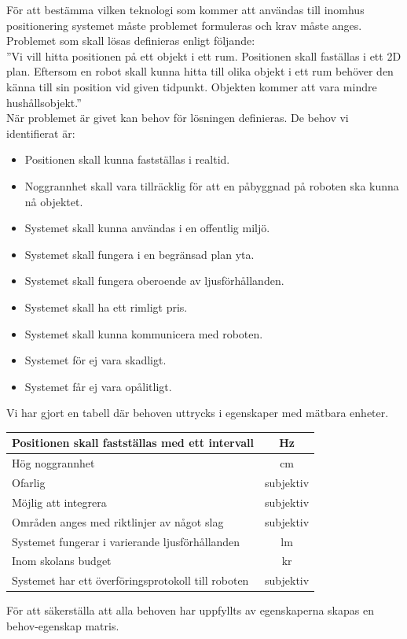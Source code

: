 \documentclass[11pt, a4paper]{report}
\begin{document}
För att bestämma vilken teknologi som kommer att användas till inomhus positionering systemet måste problemet formuleras och krav måste anges. Problemet som skall lösas definieras enligt följande: \\

''Vi vill hitta positionen på ett objekt i ett rum. Positionen skall faställas i ett 2D plan. Eftersom en robot skall kunna hitta till olika objekt  i ett rum behöver den känna till sin position vid given tidpunkt. Objekten kommer att vara mindre hushållsobjekt.'' \\

När problemet är givet kan behov för lösningen definieras. De behov vi identifierat är:

\begin{itemize}
	\item Positionen skall kunna fastställas i realtid.
	\item Noggrannhet skall vara tillräcklig för att en påbyggnad på roboten ska kunna nå objektet.
	\item Systemet skall kunna användas i en offentlig miljö.
	\item Systemet skall fungera i en begränsad plan yta.
	\item Systemet skall fungera oberoende av ljusförhållanden.
	\item Systemet skall ha ett rimligt pris.
	\item Systemet skall kunna kommunicera med roboten.
	\item Systemet för ej vara skadligt.
	\item Systemet får ej vara opålitligt.
\end{itemize}

Vi har gjort en tabell där behoven uttrycks i egenskaper med mätbara enheter.\\

\begin{center}
     \begin{tabular}{l | c}
  		Positionen skall fastställas med ett intervall & Hz \\ \hline
        Hög noggrannhet & cm\\ \hline
        Ofarlig & subjektiv\\ \hline
        Möjlig att integrera & subjektiv\\ \hline
        Områden anges med riktlinjer av något slag & subjektiv \\ \hline
        Systemet fungerar i varierande ljusförhållanden & lm \\ \hline
        Inom skolans budget & kr \\ \hline
        Systemet har ett överföringsprotokoll till roboten & subjektiv
  \end{tabular}
\end{center}
\cleardoublepage
För att säkerställa att alla behoven har uppfyllts av egenskaperna skapas en behov-egenskap matris.
\end{document}
